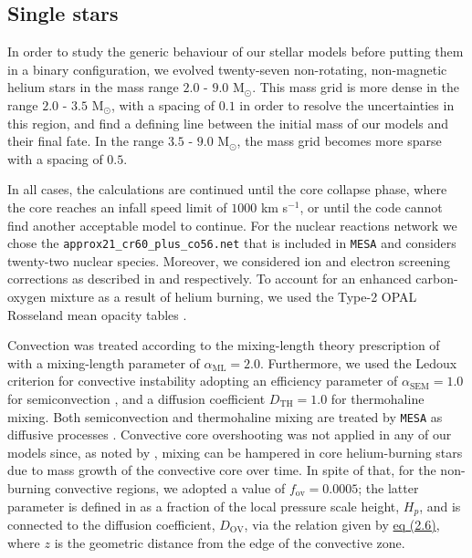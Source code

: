 \documentclass[../../main/thesis_msc.tex]{subfiles}
\begin{document}
    				\subsection{Single stars}
    				
    					In order to study the generic behaviour of our stellar models before putting them in a binary configuration, we evolved twenty-seven non-rotating, non-magnetic helium stars in the mass range $2.0$ - $9.0$ M$_{\odot}$. This mass grid is more dense in the range $2.0$ - $3.5$ M$_{\odot}$, with a spacing of $0.1$ in order to resolve the uncertainties in this region, and find a defining line between the initial mass of our models and their final fate. In the range $3.5$ - $9.0$ M$_{\odot}$, the mass grid becomes more sparse with a spacing of $0.5$.
    					
    					In all cases, the calculations are continued until the core collapse phase, where the core reaches an infall speed limit of $1000$ km s$^{-1}$, or until the code cannot find another acceptable model to continue. For the nuclear reactions network we chose the \texttt{approx21\_cr60\_plus\_co56.net} that is included in \texttt{MESA} and considers twenty-two nuclear species. Moreover, we considered ion and electron screening corrections as described in \cite{PCR2009} and \cite{Itoh2002} respectively. To account for an enhanced carbon-oxygen mixture as a result of helium burning, we used the Type-2 OPAL Rosseland mean opacity tables \citep{OPAL}.
    					
    					Convection was treated according to the mixing-length theory prescription of \cite{MLT_Henyey} with a mixing-length parameter of $\alpha_{\text{ML}} = 2.0$. Furthermore, we used the Ledoux criterion for convective instability adopting an efficiency parameter of $\alpha_{\text{SEM}} = 1.0$ for semiconvection \citep{Langer1991}, and a diffusion coefficient $D_{\text{TH}} = 1.0$ for thermohaline mixing. Both semiconvection and thermohaline mixing are treated by \texttt{MESA} as diffusive processes \citep{Langer1983, Kipp_thermohaline}. Convective core overshooting was not applied in any of our models since, as noted by \cite{Tauris_ultra}, mixing can be hampered in core helium-burning stars due to mass growth of the convective core over time. In spite of that, for the non-burning convective regions, we adopted a value of $f_{\text{ov}} = 0.0005$; the latter parameter is defined in \cite{Herwig2000} as a fraction of the local pressure scale height, $H_p$, and is connected to the diffusion coefficient, $D_{\text{OV}}$, via the relation given by \hyperref[eq:OV_diff]{eq (2.6)}, where $z$ is the geometric distance from the edge of the convective zone.
    					
\end{document}

